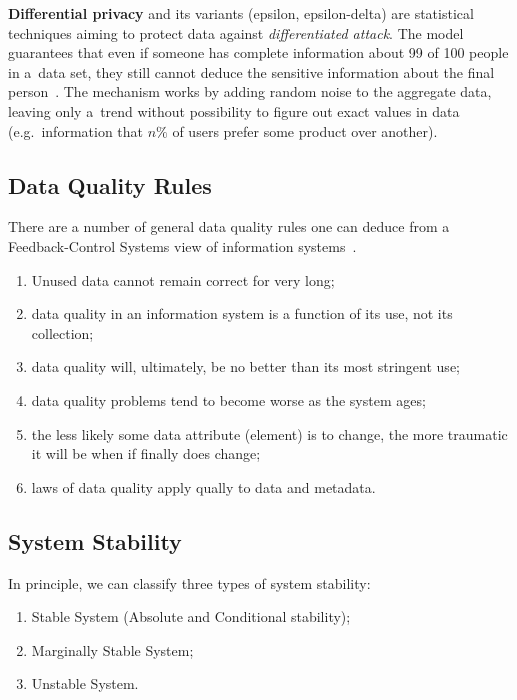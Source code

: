 \textbf{Differential privacy} and its variants (epsilon, epsilon-delta) are statistical techniques aiming to protect data against \textit{differentiated attack}.
The model guarantees that even if someone has complete information about 99 of 100 people in a~data set, they still cannot deduce the sensitive information about the final person~\cite{web:differential-privacy}.
The mechanism works by adding random noise to the aggregate data, leaving only a~trend without possibility to figure out exact values in data (e.g.\ information that \( n\% \) of users prefer some product over another).

\subsection{Data Quality Rules}

There are a number of general data quality rules one can deduce from a Feedback-Control Systems view of information systems~\cite{orr1998}.

\begin{enumerate}
    \item Unused data cannot remain correct for very long;
    \item data quality in an information system is a function of its use, not its collection;
    \item data quality will, ultimately, be no better than its most stringent use;
    \item data quality problems tend to become worse as the system ages;
    \item the less likely some data attribute (element) is to change, the more traumatic it will be when if finally does change;
    \item laws of data quality apply qually to data and metadata.
\end{enumerate}

\subsection{System Stability}

In principle, we can classify three types of system stability:

\begin{enumerate}
    \item Stable System (Absolute and Conditional stability);
    \item Marginally Stable System;
    \item Unstable System.
\end{enumerate}

